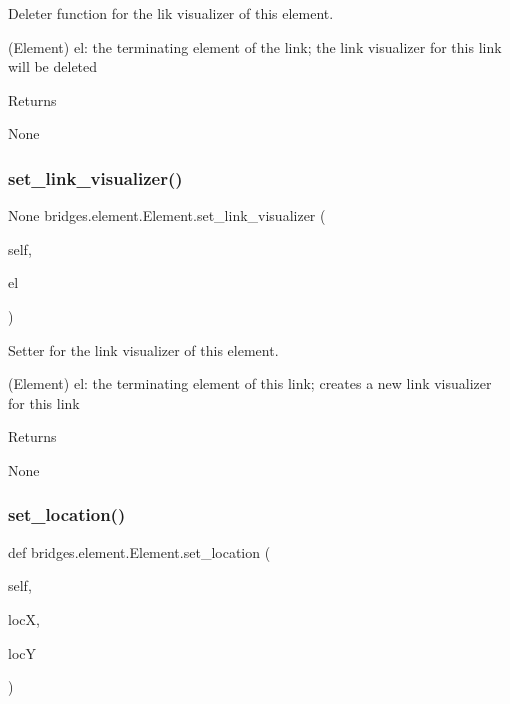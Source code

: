 Deleter function for the lik visualizer of this element. 

\begin{DoxyVerb}       (Element) el: the terminating element of the link; the link visualizer
       for this link will be deleted
\end{DoxyVerb}
 \begin{DoxyReturn}{Returns}


None 
\end{DoxyReturn}
\mbox{\label{classbridges_1_1element_1_1_element_ae2dd2e2d88be1e89adec25166d421813}} 
\subsubsection{\texorpdfstring{set\_link\_visualizer()}{set\_link\_visualizer()}}
{\footnotesize\ttfamily  None bridges.\+element.\+Element.\+set\+\_\+link\+\_\+visualizer (\begin{DoxyParamCaption}\item[{}]{self,  }\item[{}]{el }\end{DoxyParamCaption})}



Setter for the link visualizer of this element. 

\begin{DoxyVerb}       (Element) el: the terminating element of this link;
        creates a new link visualizer for this link
\end{DoxyVerb}
 \begin{DoxyReturn}{Returns}


None 
\end{DoxyReturn}
\mbox{\label{classbridges_1_1element_1_1_element_aa1387621f7afa6b6f6acd052a1126320}} 
\subsubsection{\texorpdfstring{set\_location()}{set\_location()}}
{\footnotesize\ttfamily def bridges.\+element.\+Element.\+set\+\_\+location (\begin{DoxyParamCaption}\item[{}]{self,  }\item[{}]{locX,  }\item[{}]{locY }\end{DoxyParamCaption})}



